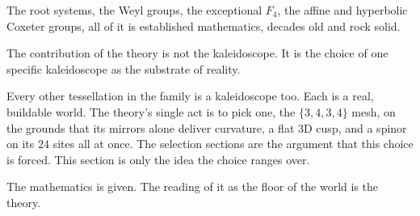 The root systems, the Weyl groups, the exceptional $F_4$, the affine and hyperbolic Coxeter groups, all of it is established mathematics, decades old and rock solid.

\begin{principle}
The contribution of the theory is not the kaleidoscope. It is the choice of one specific kaleidoscope as the substrate of reality.
\end{principle}

Every other tessellation in the family is a kaleidoscope too. Each is a real, buildable world. The theory's single act is to pick one, the $\{3,4,3,4\}$ mesh, on the grounds that its mirrors alone deliver curvature, a flat 3D cusp, and a spinor on its $24$ sites all at once. The selection sections are the argument that this choice is forced. This section is only the idea the choice ranges over.

The mathematics is given. The reading of it as the floor of the world is the theory.
